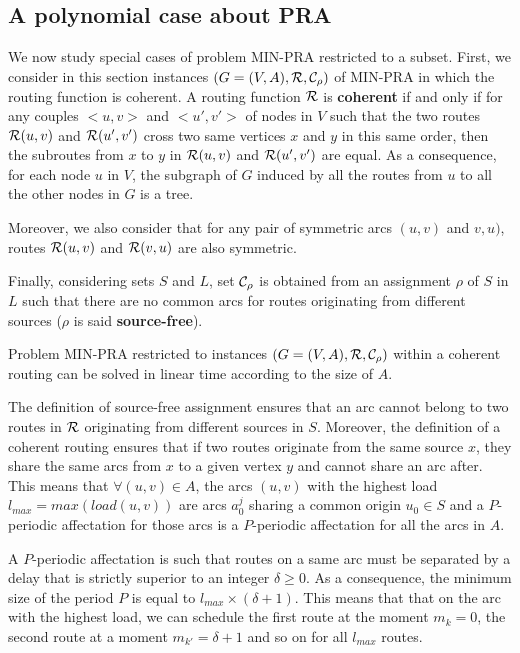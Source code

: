 \documentclass{article}
\begin{document}
 \subsection{A polynomial case about PRA}
 
We now study special cases of problem MIN-PRA restricted to a subset.  First, we consider in this section instances $(G=(V,A),{\cal R}, {\cal C}_{\rho})$ of MIN-PRA in which the routing function is coherent.  A  routing function $\cal R$ is {\bf coherent} if and only if for any couples $<u,v>$ and $ <u',v'>$ of nodes in $V$ such that the two routes ${\cal R}(u,v)$ and ${\cal R}(u',v')$ cross two same vertices $x$ and $y$  in this same order, then the subroutes  from $x$ to $y$  in ${\cal R}(u,v)$ and ${\cal R}(u',v')$ are equal. As a consequence, for each node $u$ in $V$, the subgraph of $G$ induced by all the routes from $u$ to all the other nodes in $G$ is a tree.

Moreover, we also consider that for any pair of symmetric arcs $(u,v)$ and $v,u)$, routes ${\cal R}(u,v)$ and ${\cal R}(v,u)$ are also symmetric.

Finally, considering sets $S$ and $L$, set  ${\cal C}_{\rho}$ is obtained from an assignment $\rho$ of $S$ in $L$ such that  there are no common arcs for routes originating from different sources ($\rho$ is said {\bf source-free}).

\begin{proposition}
\label{DP-PRA}
Problem MIN-PRA restricted to instances $(G=(V,A),{\cal R}, {\cal C}_{\rho})$ within a coherent routing can be solved in linear time according to the size of $A$.
\end{proposition}

 The definition of source-free assignment ensures that an arc cannot belong to two routes in $\cal R$ originating from different sources in $S$. Moreover, the definition of a coherent routing  ensures that if two routes originate from the same source $x$, they share the same arcs from $x$ to a given vertex $y$ and cannot share an arc after. This means that $\forall (u,v) \in A$, the arcs $(u,v)$ with the highest load $l_{max} = max(load(u,v))$ are arcs $a_0^j$ sharing a common origin $u_0 \in S$ and a $P$-periodic affectation for those arcs is a $P$-periodic affectation for all the arcs in $A$.

A $P$-periodic affectation is such that routes on a same arc must be separated by a delay that is strictly superior to an integer $\delta \geq 0$. As a consequence, the minimum size of the period $P$ is equal to $l_{max} \times (\delta + 1)$. This means that that on the arc with the highest load, we can schedule the first route at the moment $m_k = 0$, the second route at a moment $m_{k'} = \delta + 1$ and so on for all $l_{max}$ routes. 
\end{document}
